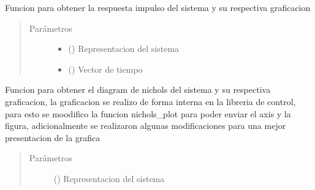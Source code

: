 \documentclass[letterpaper,10pt,spanish]{sphinxmanual}
\begin{document}

\begin{fulllineitems}
\label{\detokenize{codigos/rutinas_analisis:rutinas_analisis.rutina_impulse_plot}}
Funcion para obtener la respuesta impulso del sistema y su respectiva graficacion
\begin{quote}\begin{description}
\item[{Parámetros}] \leavevmode\begin{itemize}
\item {} 
 () \textendash{} Representacion del sistema

\item {} 
 () \textendash{} Vector de tiempo

\end{itemize}

\end{description}\end{quote}

\end{fulllineitems}


\begin{fulllineitems}
\label{\detokenize{codigos/rutinas_analisis:rutinas_analisis.rutina_nichols_plot}}
Funcion para obtener el diagram de nichols del sistema y su respectiva graficacion, la graficacion se realizo de forma interna en la libreria de control, para esto se moodifico la funcion nichols\_plot para poder enviar el axis y la figura, adicionalmente se realizaron algunas modificaciones para una mejor presentacion de la grafica
\begin{quote}\begin{description}
\item[{Parámetros}] \leavevmode
{} () \textendash{} Representacion del sistema

\end{description}\end{quote}

\end{fulllineitems}
\end{document}
